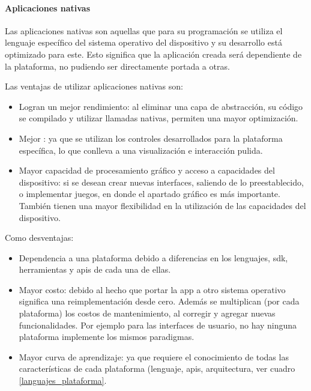 \paragraph{Aplicaciones nativas}
\label{apps_nativas}

Las aplicaciones nativas son aquellas que para su programación se utiliza el lenguaje específico del sistema operativo del dispositivo y su desarrollo está optimizado para este. Esto significa que la aplicación creada será dependiente de la plataforma, no pudiendo ser directamente portada a otras\cite{charland2011mobile}.

Las ventajas de utilizar aplicaciones nativas son:
\begin{itemize}
\item Logran un mejor rendimiento: al eliminar una capa de abstracción, su código se compilado y utilizar llamadas nativas, permiten una mayor optimización.
\item Mejor : ya que se utilizan los controles desarrollados para la plataforma específica, lo que conlleva a una visualización e interacción pulida.
\item Mayor capacidad de procesamiento gráfico y acceso a capacidades del dispositivo: si se desean crear nuevas interfaces, saliendo de lo preestablecido, o implementar juegos, en donde el apartado gráfico es más importante. También tienen una mayor flexibilidad en la utilización de las capacidades del dispositivo.
\end{itemize}

Como desventajas:
\begin{itemize}
\item Dependencia a una plataforma debido a diferencias en los lenguajes, \gls{sdk}, herramientas y \glspl{api} de cada una de ellas.
\item Mayor costo: debido al hecho que portar la \gls{app} a otro sistema operativo significa una reimplementación desde cero. Además se multiplican (por cada plataforma) los costos de mantenimiento, al corregir y agregar nuevas funcionalidades. Por ejemplo para las interfaces de usuario, no hay ninguna plataforma implemente los mismos paradigmas.
\item Mayor curva de aprendizaje: ya que requiere el conocimiento de todas las características de cada plataforma (lenguaje, \glspl{api}, arquitectura, ver cuadro \ref{languajes_plataforma}.
\end{itemize}


